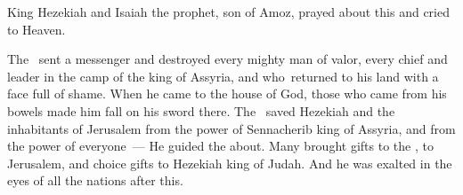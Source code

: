 \begin{inparaenum}
   King Hezekiah and Isaiah the prophet, son of Amoz, prayed about this and cried to Heaven.%
  
   The \lord\ sent a messenger and destroyed every mighty man of valor, every chief and leader in the camp of the king of Assyria, and who\understood\ returned to his land with a face full of shame. When he came to the house of God, those who came from his bowels made him fall on his sword there.%
   The \lord\ saved Hezekiah and the inhabitants of Jerusalem from the power of Sennacherib king of Assyria, and from the power of everyone~--- He guided the about.%
   Many brought gifts to the \lord, to Jerusalem, and choice gifts to Hezekiah king of Judah. And he was exalted in the eyes of all the nations after this.%
  

\end{inparaenum}
